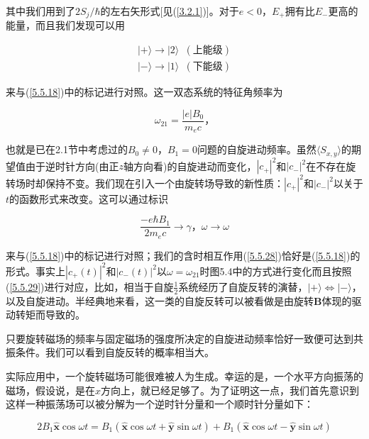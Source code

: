 ﻿\documentclass[UTF8,twoside]{ctexart}
\begin{document}
\noindent 其中我们用到了$2S_j/\hbar$的左右矢形式[见(\ref{3.2.1})]。对于$e<0$，$E_+$拥有比$E_-$更高的能量，而且我们发现可以用

\begin{equation} \label{5.5.29}
\begin{split}
|+\rangle\rightarrow|2\rangle\phantom{a}(\text{上能级})\\
|-\rangle\rightarrow|1\rangle\phantom{a}(\text{下能级})
\end{split}
\end{equation}

\noindent 来与(\ref{5.5.18})中的标记进行对照。这一双态系统的特征角频率为

\begin{equation} \label{5.5.30}
\omega_{21}=\dfrac{|e|B_0}{m_e c}\text{，}
\end{equation}

\noindent 也就是已在2.1节中考虑过的$B_0\neq0$，$B_1=0$问题的自旋进动频率。虽然$\langle S_{x,y}\rangle$的期望值由于逆时针方向(由正$z$轴方向看)的自旋进动而变化，$|c_+|^2$和$|c_-|^2$在不存在旋转场时却保持不变。我们现在引入一个由旋转场导致的新性质：$|c_+|^2$和$|c_-|^2$以关于$t$的函数形式来改变。这可以通过标识

\begin{equation} \label{5.5.31}
\dfrac{-e\hbar B_1}{2m_e c}\rightarrow\gamma\text{，}\omega\rightarrow\omega
\end{equation}

\noindent 来与(\ref{5.5.18})中的标记进行对照；我们的含时相互作用(\ref{5.5.28})恰好是(\ref{5.5.18})的形式。事实上$|c_+(t)|^2$和$|c_-(t)|^2$以$\omega=\omega_{21}$时图5.4中的方式进行变化而且按照(\ref{5.5.29})进行对应，比如，相当于自旋$\frac{1}{2}$系统经历了自旋反转的演替，$|+\rangle\Leftrightarrow|-\rangle$，以及自旋进动。半经典地来看，这一类的自旋反转可以被看做是由旋转$\boldsymbol{B}$体现的驱动转矩而导致的。

只要旋转磁场的频率与固定磁场的强度所决定的自旋进动频率恰好一致便可达到共振条件。我们可以看到自旋反转的概率相当大。

实际应用中，一个旋转磁场可能很难被人为生成。幸运的是，一个水平方向振荡的磁场，假设说，是在$x$方向上，就已经足够了。为了证明这一点，我们首先意识到这样一种振荡场可以被分解为一个逆时针分量和一个顺时针分量如下：

\begin{equation} \label{5.5.32}
2B_1\hat{\boldsymbol{x}}\cos\omega t=B_1(\hat{\boldsymbol{x}}\cos\omega t+\hat{\boldsymbol{y}}\sin\omega t)+B_1(\hat{\boldsymbol{x}}\cos\omega t-\hat{\boldsymbol{y}}\sin\omega t)
\end{equation}
\end{document}
